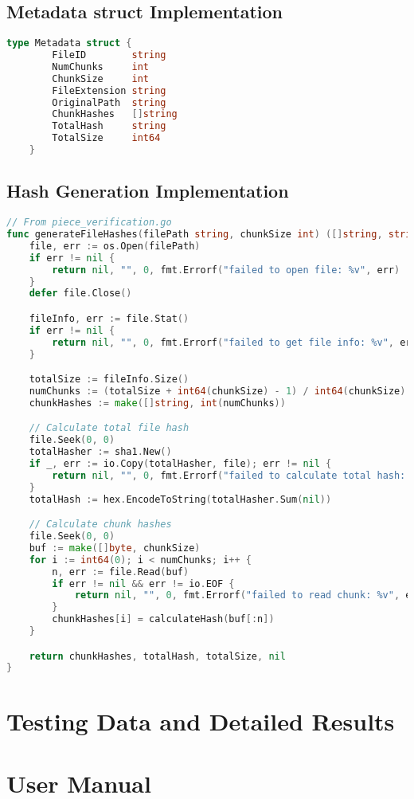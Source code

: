 \documentclass[12pt,a4paper]{report}
\begin{document}
\section{Metadata struct Implementation}
\begin{lstlisting}[language=Go, caption={Metadata Code}, label={lst:metadata-struct}]
type Metadata struct {
		FileID        string
		NumChunks     int
		ChunkSize     int
		FileExtension string
		OriginalPath  string
		ChunkHashes   []string
		TotalHash     string
		TotalSize     int64
	}
\end{lstlisting}

\section{Hash Generation Implementation}
\begin{lstlisting}[language=Go, caption={generateFileHashes Code}, label={lst:generate-file-hashes}]
// From piece_verification.go
func generateFileHashes(filePath string, chunkSize int) ([]string, string, int64, error) {
    file, err := os.Open(filePath)
    if err != nil {
        return nil, "", 0, fmt.Errorf("failed to open file: %v", err)
    }
    defer file.Close()

    fileInfo, err := file.Stat()
    if err != nil {
        return nil, "", 0, fmt.Errorf("failed to get file info: %v", err)
    }

    totalSize := fileInfo.Size()
    numChunks := (totalSize + int64(chunkSize) - 1) / int64(chunkSize)
    chunkHashes := make([]string, int(numChunks))

    // Calculate total file hash
    file.Seek(0, 0)
    totalHasher := sha1.New()
    if _, err := io.Copy(totalHasher, file); err != nil {
        return nil, "", 0, fmt.Errorf("failed to calculate total hash: %v", err)
    }
    totalHash := hex.EncodeToString(totalHasher.Sum(nil))

    // Calculate chunk hashes
    file.Seek(0, 0)
    buf := make([]byte, chunkSize)
    for i := int64(0); i < numChunks; i++ {
        n, err := file.Read(buf)
        if err != nil && err != io.EOF {
            return nil, "", 0, fmt.Errorf("failed to read chunk: %v", err)
        }
        chunkHashes[i] = calculateHash(buf[:n])
    }

    return chunkHashes, totalHash, totalSize, nil
}
\end{lstlisting}

\chapter{Testing Data and Detailed Results}

\chapter{User Manual}

\renewcommand\bibname{References}
\begin{raggedright} %
	
	
\end{raggedright}
\end{document}
